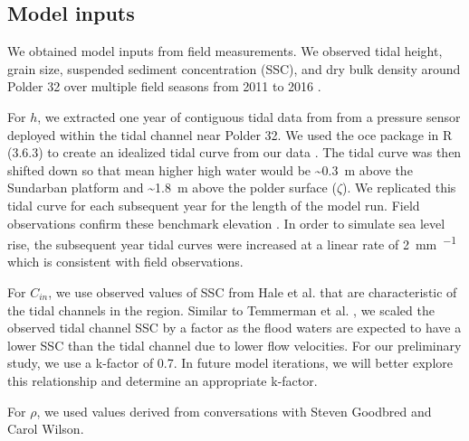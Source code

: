 \documentclass[9pt,twocolumn,twoside,lineno]{pnas-new}
\begin{document}

\subsection*{Model inputs}

We obtained model inputs from field measurements. We observed tidal height, grain size, suspended sediment concentration (SSC), and dry bulk density around Polder 32 over multiple field seasons from 2011 to 2016 \cite{auerbachFloodRiskNatural2015,haleObservationsScalingTidal2019,haleSeasonalVariabilityForces2019}.

For $h$, we extracted one year of contiguous tidal data from from a pressure sensor deployed within the tidal channel near Polder 32. We used the oce package in R (3.6.3) to create an idealized tidal curve from our data \cite{kelleyOceAnalysisOceanographic2020}. The tidal curve was then shifted down so that mean higher high water would be \SI{~0.3}{\meter} above the Sundarban platform and \SI{~1.8}{\meter} above the polder surface ($\zeta$). We replicated this tidal curve for each subsequent year for the length of the model run. Field observations confirm these benchmark elevation \cite{auerbachFloodRiskNatural2015,haleSeasonalVariabilityForces2019,bomerSurfaceElevationSedimentation2020}. In order to simulate sea level rise, the subsequent year tidal curves were increased at a linear rate of \SI{2}{\milli\meter\per\year} which is consistent with field observations.


For $C_{in}$, we use observed values of SSC from Hale et al. \cite{haleObservationsScalingTidal2019} that are characteristic of the tidal channels in the region. Similar to Temmerman et al. \cite{temmermanModellingLongtermTidal2003,temmermanModellingEstuarineVariations2004}, we scaled the observed tidal channel SSC by a factor as the flood waters are expected to have a lower SSC than the tidal channel due to lower flow velocities. For our preliminary study, we use a k-factor of 0.7. In future model iterations, we will better explore this relationship and determine an appropriate k-factor.

For $\rho$, we used values derived from conversations with Steven Goodbred and Carol Wilson.

\end{document}
